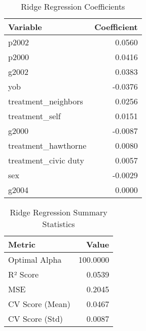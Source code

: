 \begin{table}
\caption{Ridge Regression Coefficients}
\label{tab:ridge_coefficients}
\begin{tabular}{lr}
\toprule
Variable & Coefficient \\
\midrule
p2002 & 0.0560 \\
p2000 & 0.0416 \\
g2002 & 0.0383 \\
yob & -0.0376 \\
treatment_neighbors & 0.0256 \\
treatment_self & 0.0151 \\
g2000 & -0.0087 \\
treatment_hawthorne & 0.0080 \\
treatment_civic duty & 0.0057 \\
sex & -0.0029 \\
g2004 & 0.0000 \\
\bottomrule
\end{tabular}
\end{table}


\begin{table}
\caption{Ridge Regression Summary Statistics}
\label{tab:ridge_summary}
\begin{tabular}{lr}
\toprule
Metric & Value \\
\midrule
Optimal Alpha & 100.0000 \\
R² Score & 0.0539 \\
MSE & 0.2045 \\
CV Score (Mean) & 0.0467 \\
CV Score (Std) & 0.0087 \\
\bottomrule
\end{tabular}
\end{table}
